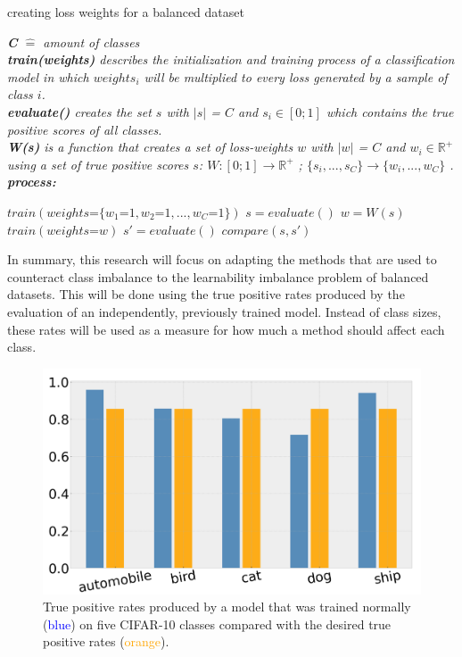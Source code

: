 \documentclass[journal]{IEEEtran}
\begin{document}
\begin{algorithm}[H]
        \caption{creating loss weights for a balanced dataset}

        \textit{\textbf{C} $\hat{=}$ amount of classes}
        \\ \textit{\textbf{train(weights)} describes the initialization and training process of a classification model in which $weights_i$ will be multiplied to every loss generated by a sample of class $i$.}
        \\ \textit{\textbf{evaluate()} creates the set $s$ with $\left|s\right|$ = $C$ and $s_i \in [0;1]$ which contains the true positive scores of all classes.}
        \\ \textit{\textbf{W(s)} is a function that creates a set of loss-weights $w$ with $\left|w\right|$ = $C$ and $w_i \in \mathbb{R}^{+}$ using a set of true positive scores $s$: $W: [0;1] \rightarrow \mathbb{R}^{+}$ ; $\{s_i,...,s_C\} \rightarrow \{w_i,...,w_C\}$ .}
        \\ \textit{\textbf{process:}}
        \begin{algorithmic}[1]
         \STATE $train(weights\texttt{=}\{w_1\texttt{=}1, w_2\texttt{=}1, ..., w_C\texttt{=}1\})$
         \STATE $s = evaluate()$
         \STATE $w = W(s)$
         \STATE $train(weights\texttt{=}w)$
         \STATE $s' = evaluate()$
         \STATE $compare(s, s')$

        \end{algorithmic}
\end{algorithm}

In summary, this research will focus on adapting the methods that are used to counteract class imbalance to the learnability imbalance problem of balanced datasets.
This will be done using the true positive rates produced by the evaluation of an independently, previously trained model.
Instead of class sizes, these rates will be used as a measure for how much a method should affect each class.

\begin{figure}[h!]
        \includegraphics[width=\linewidth]{images/tp_comparison.png}
        \caption{True positive rates produced by a model that was trained normally (\textcolor{blue}{blue}) on five CIFAR-10 classes compared with the desired true positive rates (\textcolor{orange}{orange}).}
        \label{fig:tp_comparsion}
\end{figure}
\end{document}

